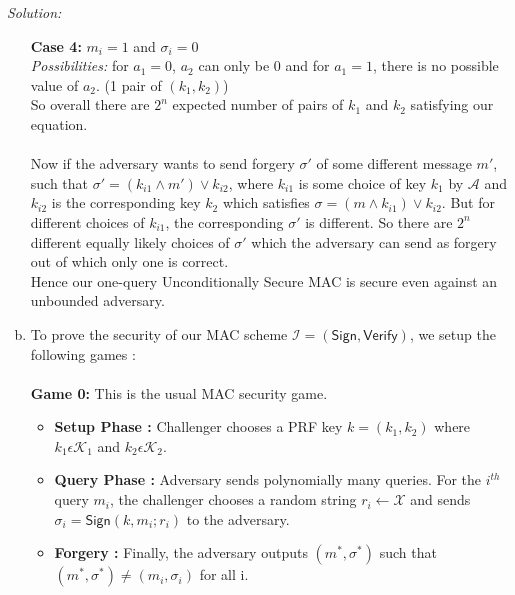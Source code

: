 \documentclass[a4paper, 11pt]{article}
\newenvironment{solution}
    {\textit{Solution:}}
    {\clearpage}
\newcommand{\sign}{\mathsf{Sign}}
\newcommand{\verif}{\mathsf{Verify}}
\newcommand{\calA}{\mathcal{A}}
\newcommand{\calI}{\mathcal{I}}
\newcommand{\calK}{\mathcal{K}}
\newcommand{\calX}{\mathcal{X}}
\begin{document}
\begin{solution}
\begin{enumerate}[(a)]
              \textbf{Case 4:} $m_i = 1$ and $\sigma_i = 0$ \\
              \textit{Possibilities:} for $a_1 = 0$, $a_2$ can only be 0 and for $a_1 = 1$, there is no possible value of $a_2$. (1 pair of $(k_1, k_2)$)\\
              So overall there are $2^n$ expected number of pairs of $k_1$ and $k_2$ satisfying our equation. \\ \\
              Now if the adversary wants to send forgery $\sigma'$ of some different message $m'$, such that $\sigma' = (k_{i1} \wedge m') \vee k_{i2}$, where $k_{i1}$ is some choice of key $k_1$ by $\calA$ and $k_{i2}$ is the corresponding key $k_2$ which satisfies $\sigma = (m \wedge k_{i1}) \vee k_{i2}$. But for different choices of $k_{i1}$, the corresponding $\sigma'$ is different. So there are $2^n$ different equally likely choices of $\sigma'$ which the adversary can send as forgery out of which only one is correct.\\
              Hence our one-query Unconditionally Secure MAC is secure even against an unbounded adversary.

        \item To prove the security of our MAC scheme $\calI = (\sign, \verif)$, we setup the following games : \\ \\
              \textbf{Game 0:} This is the usual MAC security game.
              \begin{itemize}
                  \item \textbf{Setup Phase :} Challenger chooses a PRF key $k = (k_1, k_2)$ where $k_1 \epsilon \calK_1$ and $k_2 \epsilon \calK_2$.
                  \item \textbf{Query Phase :} Adversary sends polynomially many queries. For the $i^{th}$ query $m_i$, the challenger chooses a random string $r_i \leftarrow \calX$ and sends $\sigma_i = \sign(k, m_i ; r_i)$ to the adversary.
                  \item \textbf{Forgery :} Finally, the adversary outputs $(m^*, \sigma^*)$ such that $(m^*, \sigma^*) \neq (m_i, \sigma_i)$ for all i.
              \end{itemize}


\end{enumerate}
\end{solution}
\end{document}
